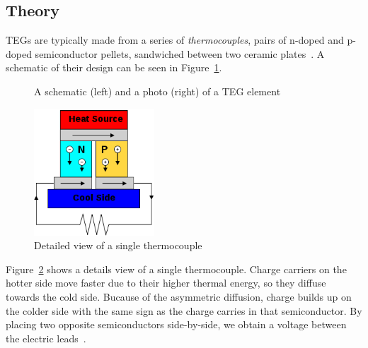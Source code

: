 \documentclass[a4paper,10pt]{article}
\begin{document}
\subsection{Theory}

\acp{TEG} are typically made from a series of \textit{thermocouples}, pairs of n-doped and p-doped semiconductor pellets, sandwiched between two ceramic plates~\cite{Salerno10}. A schematic of their design can be seen in Figure~\ref{fig:teg-schematic}. 

\begin{figure}[h]
\caption{A schematic (left) and a photo (right) of a \ac{TEG} element~\cite{Salerno10,wiki:teg}}
\label{fig:teg-schematic}
\end{figure}


\begin{figure}
\centering
\includegraphics[height=135pt]{./Slike/TEG-couple}
 \caption{Detailed view of a single thermocouple~\cite{wiki:thermo}}
\label{fig:teg-couple}
\end{figure}

Figure~\ref{fig:teg-couple} shows a details view of a single thermocouple. Charge carriers on the hotter side move faster due to their higher thermal energy, so they diffuse towards the cold side. Bucause of the asymmetric diffusion, charge builds up on the colder side with the same sign as the charge carries in that semiconductor. By placing two opposite semiconductors side-by-side, we obtain a voltage between the electric leads~\cite{wiki:thermo}. 
\end{document}
